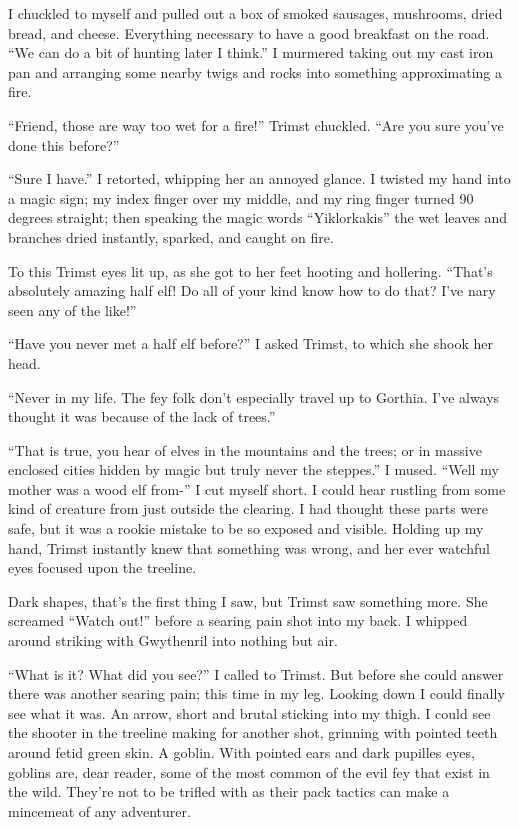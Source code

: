 \documentclass[12pt, a4paper]{book}
\begin{document}
I chuckled to myself and pulled out a box of smoked sausages, mushrooms, dried bread, and cheese. Everything necessary to have a good breakfast on the road. ``We can do a bit of hunting later I think.'' I murmered taking out my cast iron pan and arranging some nearby twigs and rocks into something approximating a fire.

``Friend, those are way too wet for a fire!'' Trimst chuckled. ``Are you sure you've done this before?''

``Sure I have.'' I retorted, whipping her an annoyed glance. I twisted my hand into a magic sign; my index finger over my middle, and my ring finger turned 90 degrees straight; then speaking the magic words ``Yiklorkakis'' the wet leaves and branches dried instantly, sparked, and caught on fire.

To this Trimst eyes lit up, as she got to her feet hooting and hollering. ``That's absolutely amazing half elf! Do all of your kind know how to do that? I've nary seen any of the like!''

``Have you never met a half elf before?'' I asked Trimst, to which she shook her head.

``Never in my life. The fey folk don't especially travel up to Gorthia. I've always thought it was because of the lack of trees.''

``That is true, you hear of elves in the mountains and the trees; or in massive enclosed cities hidden by magic but truly never the steppes.'' I mused. ``Well my mother was a wood elf from-'' I cut myself short. I could hear rustling from some kind of creature from just outside the clearing. I had thought these parts were safe, but it was a rookie mistake to be so exposed and visible. Holding up my hand, Trimst instantly knew that something was wrong, and her ever watchful eyes focused upon the treeline.

Dark shapes, that's the first thing I saw, but Trimst saw something more. She screamed ``Watch out!'' before a searing pain shot into my back. I whipped around striking with Gwythenril into nothing but air.

``What is it? What did you see?'' I called to Trimst. But before she could answer there was another searing pain; this time in my leg. Looking down I could finally see what it was. An arrow, short and brutal sticking into my thigh. I could see the shooter in the treeline making for another shot, grinning with pointed teeth around fetid green skin. A goblin. With pointed ears and dark pupilles eyes, goblins are, dear reader, some of the most common of the evil fey that exist in the wild. They're not to be trifled with as their pack tactics can make a mincemeat of any adventurer. 
\end{document}
